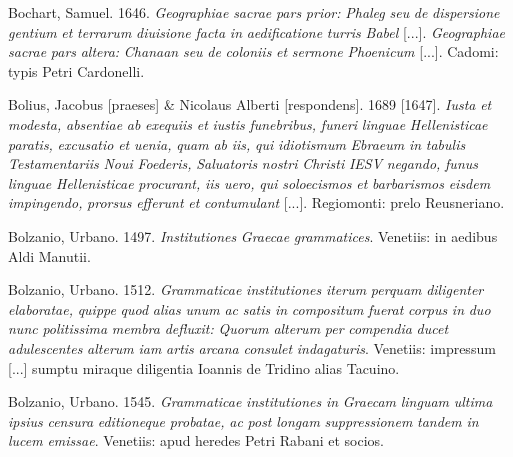 \documentclass[output=paper]{langsci/langscibook}
\begin{document}
Bochart, Samuel. 1646. \textit{Geographiae} \textit{sacrae} \textit{pars} \textit{prior:} \textit{Phaleg} \textit{seu} \textit{de} \textit{dispersione} \textit{gentium} \textit{et} \textit{terrarum} \textit{diuisione} \textit{facta} \textit{in} \textit{aedificatione} \textit{turris} \textit{Babel} [...]. \textit{Geographiae} \textit{sacrae} \textit{pars} \textit{altera:} \textit{Chanaan} \textit{seu} \textit{de} \textit{coloniis} \textit{et} \textit{sermone} \textit{Phoenicum} [...]. Cadomi: typis Petri Cardonelli.

Bolius, Jacobus [praeses] \& Nicolaus Alberti [respondens]. 1689 [1647]. \textit{Iusta} \textit{et} \textit{modesta,} \textit{absentiae} \textit{ab} \textit{exequiis} \textit{et} \textit{iustis} \textit{funebribus,} \textit{funeri} \textit{linguae} \textit{Hellenisticae} \textit{paratis,} \textit{excusatio} \textit{et} \textit{uenia,} \textit{quam} \textit{ab} \textit{iis,} \textit{qui} \textit{idiotismum} \textit{Ebraeum} \textit{in} \textit{tabulis} \textit{Testamentariis} \textit{Noui} \textit{Foederis,} \textit{Saluatoris} \textit{nostri} \textit{Christi} \textit{IESV} \textit{negando,} \textit{funus} \textit{linguae} \textit{Hellenisticae} \textit{procurant,} \textit{iis} \textit{uero,} \textit{qui} \textit{soloecismos} \textit{et} \textit{barbarismos} \textit{eisdem} \textit{impingendo,} \textit{prorsus} \textit{efferunt} \textit{et} \textit{contumulant} [...]. Regiomonti: prelo Reusneriano.

Bolzanio, Urbano. 1497. \textit{Institutiones} \textit{Graecae} \textit{grammatices}. Venetiis: in aedibus Aldi Manutii.

Bolzanio, Urbano. 1512. \textit{Grammaticae} \textit{institutiones} \textit{iterum} \textit{perquam} \textit{diligenter} \textit{elaboratae,} \textit{quippe} \textit{quod} \textit{alias} \textit{unum} \textit{ac} \textit{satis} \textit{in} \textit{compositum} \textit{fuerat} \textit{corpus} \textit{in} \textit{duo} \textit{nunc} \textit{politissima} \textit{membra} \textit{defluxit:} \textit{Quorum} \textit{alterum} \textit{per} \textit{compendia} \textit{ducet} \textit{adulescentes} \textit{alterum} \textit{iam} \textit{artis} \textit{arcana} \textit{consulet} \textit{indagaturis}. Venetiis: impressum [...] sumptu miraque diligentia Ioannis de Tridino alias Tacuino.

Bolzanio, Urbano. 1545. \textit{Grammaticae} \textit{institutiones} \textit{in} \textit{Graecam} \textit{linguam} \textit{ultima} \textit{ipsius} \textit{censura} \textit{editioneque} \textit{probatae,} \textit{ac} \textit{post} \textit{longam} \textit{suppressionem} \textit{tandem} \textit{in} \textit{lucem} \textit{emissae}. Venetiis: apud heredes Petri Rabani et socios.
\end{document}
